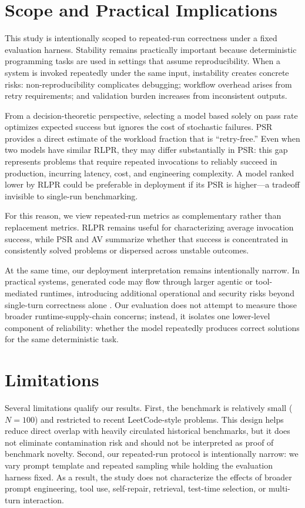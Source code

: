 \documentclass[11pt]{article}
\begin{document}
\section{Scope and Practical Implications}

This study is intentionally scoped to repeated-run correctness under a fixed evaluation harness. Stability remains practically important because deterministic programming tasks are used in settings that assume reproducibility. When a system is invoked repeatedly under the same input, instability creates concrete risks: non-reproducibility complicates debugging; workflow overhead arises from retry requirements; and validation burden increases from inconsistent outputs.

From a decision-theoretic perspective, selecting a model based solely on pass rate optimizes expected success but ignores the cost of stochastic failures. PSR provides a direct estimate of the workload fraction that is ``retry-free.'' Even when two models have similar RLPR, they may differ substantially in PSR: this gap represents problems that require repeated invocations to reliably succeed in production, incurring latency, cost, and engineering complexity. A model ranked lower by RLPR could be preferable in deployment if its PSR is higher---a tradeoff invisible to single-run benchmarking.

For this reason, we view repeated-run metrics as complementary rather than replacement metrics. RLPR remains useful for characterizing average invocation success, while PSR and AV summarize whether that success is concentrated in consistently solved problems or dispersed across unstable outcomes.

At the same time, our deployment interpretation remains intentionally narrow. In practical systems, generated code may flow through larger agentic or tool-mediated runtimes, introducing additional operational and security risks beyond single-turn correctness alone \cite{jiang2026agenticaicybersecurityattack}. Our evaluation does not attempt to measure those broader runtime-supply-chain concerns; instead, it isolates one lower-level component of reliability: whether the model repeatedly produces correct solutions for the same deterministic task.

\section{Limitations}

Several limitations qualify our results. First, the benchmark is relatively small ($N=100$) and restricted to recent LeetCode-style problems. This design helps reduce direct overlap with heavily circulated historical benchmarks, but it does not eliminate contamination risk and should not be interpreted as proof of benchmark novelty. Second, our repeated-run protocol is intentionally narrow: we vary prompt template and repeated sampling while holding the evaluation harness fixed. As a result, the study does not characterize the effects of broader prompt engineering, tool use, self-repair, retrieval, test-time selection, or multi-turn interaction.
\end{document}
